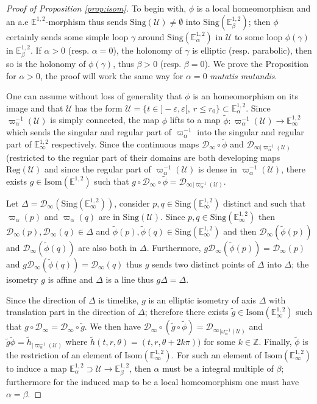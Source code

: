 \documentclass[a4paper,12pt]{article}
\def\ZZ{\mathbb{Z}}
\def\D{\mathcal{D}}
\def\U{\mathcal U}
\def\isom{Isom}
\def\D{\mathcal{D}}
\def\sing{\mathrm{Sing}}
\newcommand{\mass}[1]{{\mathbb E}^{1,2}_{#1}}
\def\isom{\mathrm{Isom}}
\def\Reg{\mathrm{Reg}}
\def\reg{\Reg}
\begin{document}
	  \begin{proof}[Proof of Proposition \ref{prop:isom}] 	  
	  To begin with, $\phi$ is a local homeomorphism and an a.e $\mass{}$-morphism thus sends $\sing(\U)\neq \emptyset$ into $\sing(\mass{\beta})$; then $\phi$ certainly sends some simple loop $\gamma$ around $\sing(\mass{\alpha})$ in $\U$ to some loop $\phi(\gamma)$ in $\mass{\beta}$. If $\alpha>0$ (resp. $\alpha=0$), the holonomy of $\gamma$ is elliptic (resp. parabolic), then so is the holonomy of $\phi(\gamma)$, thus  $\beta>0$ (resp. $\beta=0$).
 We prove the Proposition for $\alpha>0$, the proof will work the same way for $\alpha=0$ {\it mutatis mutandis}.
 	  	  
	  One can assume without loss of generality that $\phi$ is an homeomorphism on its image and that $\U$ has the form  $\U = \{t \in ]-\varepsilon,\varepsilon[,\ r \leq r_0\} \subset \mass{\alpha}$. Since $\varpi_\alpha^{-1}(\U)$ is simply connected, the map $\phi$ lifts to a map $\widetilde \phi: \varpi_\alpha^{-1}(\U) \rightarrow \mass{\infty}$ which 
	  sends the singular and regular part of $\varpi_\alpha^{-1}$ into the singular and regular part of $\mass{\infty}$ respectively. Since the continuous maps $\D_\infty\circ \widetilde \phi$ and $\D_{\infty|\varpi_\alpha^{-1}(\U)}$ 
	  (restricted to the regular part of their domains are both developing maps $\reg(\U)$ and since the regular part of $\varpi_\alpha^{-1}(\U)$ is dense in $\varpi_\alpha^{-1}(\U)$, there exists $g\in \isom(\mass{})$ such that $g\circ \D_\infty\circ \widetilde \phi = \D_{\infty|\varpi_\alpha^{-1}(\U)}$. 

Let $\Delta = \D_\infty(\sing(\mass{\infty}))$, consider 	$p,q\in \sing(\mass{\infty})$ distinct and such that $\varpi_\alpha(p)$ and
$\varpi_\alpha(q)$ are  in $\sing(\U)$.  Since 
$p,q\in \sing(\mass{\infty})$ then $\D_\infty(p),\D_\infty(q)\in \Delta$
 and $\widetilde\phi(p),\widetilde\phi(q) \in \sing(\mass{\infty})$ and then $\D_\infty(\widetilde\phi(p))$ and 
$\D_\infty(\widetilde\phi(q))$ are also both in $\Delta$. Furthermore, $g\D_\infty(\widetilde\phi(p)) = \D_\infty(p)$ and $g\D_\infty(\widetilde\phi(q)) = \D_\infty(q)$ thus $g$ sends two distinct points of $\Delta$ into $\Delta$; the isometry $g$ is affine and $\Delta$ is a line thus $g\Delta=\Delta$.

Since the direction of $\Delta$ is timelike, $g$ is an elliptic isometry of axis $\Delta$ with translation part in the direction of $\Delta$; therefore there exists $\widetilde g  \in\isom(\mass{\infty})$ such that $g\circ \D_\infty = \D_\infty \circ \widetilde g$.
We then have $\D_\infty\circ(\widetilde g \circ \widetilde \phi) = {\D_\infty}_{|\omega_{\alpha}^{-1}(\U)}$  and $\widetilde g\widetilde \phi = \widetilde h_{|\varpi_\alpha^{-1}(\U)}$ where $\widetilde h(t,r,\theta) = (t,r,\theta+2k\pi))$ for some $k\in \ZZ$. 
Finally, $\widetilde \phi$  is the restriction of an element of $\isom(\mass{\infty})$.
	For such an element of $\isom(\mass{\infty})$ to induce  a map $\mass{\alpha}\supset\U\rightarrow \mass{\beta}$, then $\alpha$ must be a integral multiple of $\beta$; furthermore for the induced map to be a local homeomorphism one must have $\alpha=\beta$.
  
	  
\end{proof}
\end{document}
